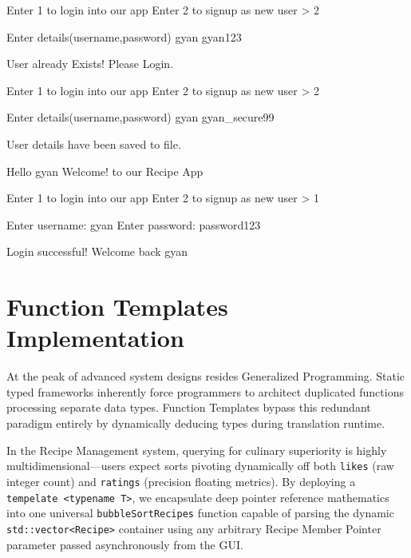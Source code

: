 \documentclass[12pt, a4paper]{article}
\begin{document}
\begin{terminalbox}
Enter 1 to login into our app
Enter 2 to signup as new user
> 2

Enter details(username,password)
gyan
gyan123

User already Exists! Please Login.
\end{terminalbox}

\begin{terminalbox}
Enter 1 to login into our app
Enter 2 to signup as new user
> 2

Enter details(username,password)
gyan
gyan_secure99

User details have been saved to file.

Hello gyan Welcome! to our Recipe App
\end{terminalbox}

\begin{terminalbox}
Enter 1 to login into our app
Enter 2 to signup as new user
> 1

Enter username: gyan
Enter password: password123

Login successful! Welcome back gyan
\end{terminalbox}

\newpage

\section{Function Templates Implementation}

At the peak of advanced system designs resides Generalized Programming. Static typed frameworks inherently force programmers to architect duplicated functions processing separate data types. Function Templates bypass this redundant paradigm entirely by dynamically deducing types during translation runtime. 

In the Recipe Management system, querying for culinary superiority is highly multidimensional—users expect sorts pivoting dynamically off both \texttt{likes} (raw integer count) and \texttt{ratings} (precision floating metrics). By deploying a \texttt{tempelate <typename T>}, we encapsulate deep pointer reference mathematics into one universal \texttt{bubbleSortRecipes} function capable of parsing the dynamic \texttt{std::vector<Recipe>} container using any arbitrary Recipe Member Pointer parameter passed asynchronously from the GUI.
\end{document}
